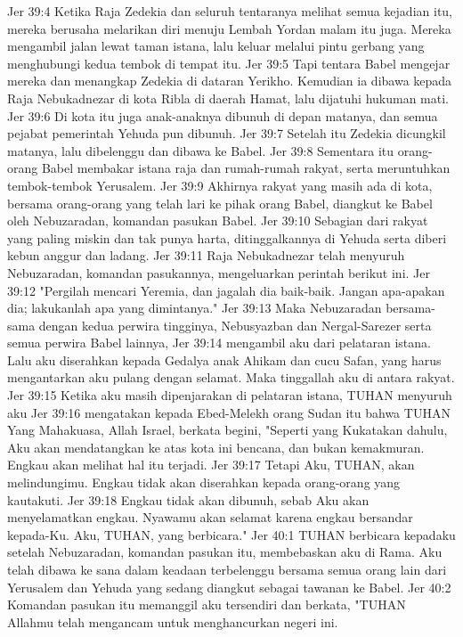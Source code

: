 Jer 39:4  Ketika Raja Zedekia dan seluruh tentaranya melihat semua kejadian itu, mereka berusaha melarikan diri menuju Lembah Yordan malam itu juga. Mereka mengambil jalan lewat taman istana, lalu keluar melalui pintu gerbang yang menghubungi kedua tembok di tempat itu.
Jer 39:5  Tapi tentara Babel mengejar mereka dan menangkap Zedekia di dataran Yerikho. Kemudian ia dibawa kepada Raja Nebukadnezar di kota Ribla di daerah Hamat, lalu dijatuhi hukuman mati.
Jer 39:6  Di kota itu juga anak-anaknya dibunuh di depan matanya, dan semua pejabat pemerintah Yehuda pun dibunuh.
Jer 39:7  Setelah itu Zedekia dicungkil matanya, lalu dibelenggu dan dibawa ke Babel.
Jer 39:8  Sementara itu orang-orang Babel membakar istana raja dan rumah-rumah rakyat, serta meruntuhkan tembok-tembok Yerusalem.
Jer 39:9  Akhirnya rakyat yang masih ada di kota, bersama orang-orang yang telah lari ke pihak orang Babel, diangkut ke Babel oleh Nebuzaradan, komandan pasukan Babel.
Jer 39:10  Sebagian dari rakyat yang paling miskin dan tak punya harta, ditinggalkannya di Yehuda serta diberi kebun anggur dan ladang.
Jer 39:11  Raja Nebukadnezar telah menyuruh Nebuzaradan, komandan pasukannya, mengeluarkan perintah berikut ini.
Jer 39:12  "Pergilah mencari Yeremia, dan jagalah dia baik-baik. Jangan apa-apakan dia; lakukanlah apa yang dimintanya."
Jer 39:13  Maka Nebuzaradan bersama-sama dengan kedua perwira tingginya, Nebusyazban dan Nergal-Sarezer serta semua perwira Babel lainnya,
Jer 39:14  mengambil aku dari pelataran istana. Lalu aku diserahkan kepada Gedalya anak Ahikam dan cucu Safan, yang harus mengantarkan aku pulang dengan selamat. Maka tinggallah aku di antara rakyat.
Jer 39:15  Ketika aku masih dipenjarakan di pelataran istana, TUHAN menyuruh aku
Jer 39:16  mengatakan kepada Ebed-Melekh orang Sudan itu bahwa TUHAN Yang Mahakuasa, Allah Israel, berkata begini, "Seperti yang Kukatakan dahulu, Aku akan mendatangkan ke atas kota ini bencana, dan bukan kemakmuran. Engkau akan melihat hal itu terjadi.
Jer 39:17  Tetapi Aku, TUHAN, akan melindungimu. Engkau tidak akan diserahkan kepada orang-orang yang kautakuti.
Jer 39:18  Engkau tidak akan dibunuh, sebab Aku akan menyelamatkan engkau. Nyawamu akan selamat karena engkau bersandar kepada-Ku. Aku, TUHAN, yang berbicara."
Jer 40:1  TUHAN berbicara kepadaku setelah Nebuzaradan, komandan pasukan itu, membebaskan aku di Rama. Aku telah dibawa ke sana dalam keadaan terbelenggu bersama semua orang lain dari Yerusalem dan Yehuda yang sedang diangkut sebagai tawanan ke Babel.
Jer 40:2  Komandan pasukan itu memanggil aku tersendiri dan berkata, "TUHAN Allahmu telah mengancam untuk menghancurkan negeri ini.
